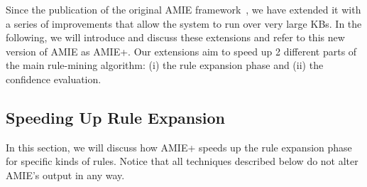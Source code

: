 Since the publication of the original AMIE framework~\cite{amie}, we have extended it with a series of improvements 
that allow the system to run over very large KBs. 
In the following, we will introduce and discuss these extensions and refer to this new version of AMIE as AMIE+.
Our extensions aim to speed up 2 different parts of the main rule-mining algorithm: (i) the rule expansion phase and 
(ii) the confidence evaluation. 







\subsection{Speeding Up Rule Expansion}
In this section, we will discuss how AMIE+ speeds up the rule expansion phase for specific kinds of rules.
Notice that all techniques described below do not alter AMIE's output in any way. 

